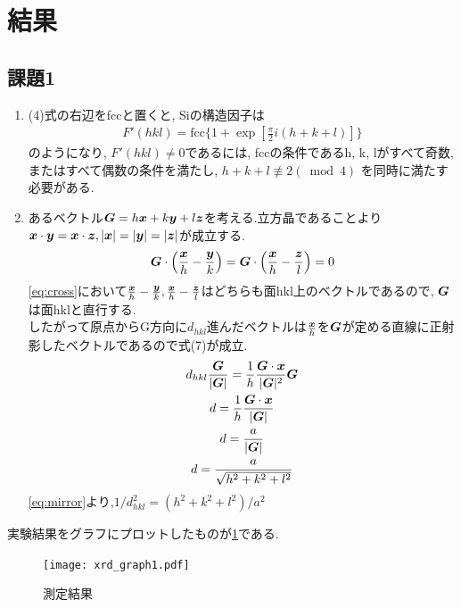 \documentclass[11pt]{ltjsarticle}
\begin{document}
  \section*{結果}
    \subsection*{課題1}
      \begin{enumerate}
        \item (4)式の右辺をfccと置くと, Siの構造因子は
          \begin{gather}
            F'(hkl)=\text{fcc}\{1+\exp[\frac{\pi}{2}i(h+k+l)]\}
          \end{gather}
          のようになり, $F'(hkl)\neq 0$であるには, fccの条件であるh, k, lがすべて奇数,またはすべて偶数の条件を満たし, $h+k+l \not\equiv 2 (\bmod 4)$
          を同時に満たす必要がある.
        \item あるベクトル$\vb*{G}=h \vb*{x}+k \vb*{y}+l \vb*{z}$を考える.立方晶であることより$\vb*{x}\cdot \vb*{y}=\vb*{x}\cdot\vb*{z}, |\vb*{x}|=|\vb*{y}|=|\vb*{z}|$が成立する.
          \begin{gather}
            \vb*{G} \cdot \qty(\frac{\vb*{x}}{h}-\frac{\vb*{y}}{k})=\vb*{G}\cdot \qty(\frac{\vb*{x}}{h}-\frac{\vb*{z}}{l})=0
            \label{eq:cross}
          \end{gather}
          \cref{eq:cross}において$\frac{\vb*{x}}{h}-\frac{\vb*{y}}{k}, \frac{\vb*{x}}{h}-\frac{\vb*{z}}{l}$はどちらも面hkl上のベクトルであるので, $\vb*{G}$は面hklと直行する. \\
          したがって原点からG方向に$d_{hkl}$進んだベクトルは$\frac{\vb*{x}}{h}$を$\vb*{G}$が定める直線に正射影したベクトルであるので式(7)が成立.\\
          \begin{gather}
            d_{hkl}\frac{\vb*{G}}{|\vb*{G}|}=\frac{1}{h}\frac{\vb*{G}\cdot \vb*{x}}{|\vb*{G}|^2}\vb*{G}\\
            d=\frac{1}{h}\frac{\vb*{G}\cdot \vb*{x}}{|\vb*{G}|}\notag\\
            d=\frac{a}{|\vb*{G}|}\notag\\
            d=\frac{a}{\sqrt{h^2 +k^2 +l^2}}
            \label{eq:mirror}
          \end{gather}
          \cref{eq:mirror}より,$1/d_{hkl}^2 =(h^2 +k^2 +l^2)/a^2$
      \end{enumerate}
    実験結果をグラフにプロットしたものが\cref{fig:xrdgraph1}である. 
    \begin{figure}[H]
      \centering
      \texttt{[image: xrd\_graph1.pdf]}
      \caption{測定結果}
      \label{fig:xrdgraph1}
    \end{figure}
\end{document}
